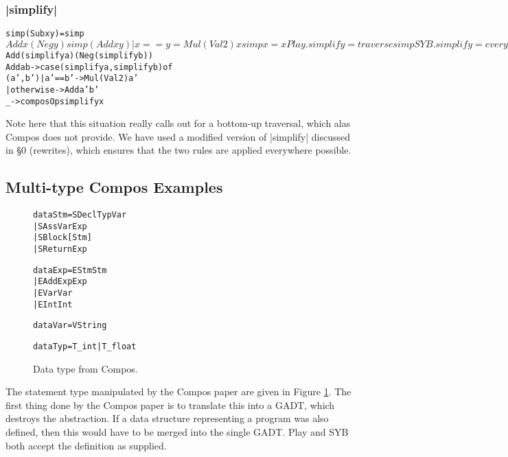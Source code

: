 \documentclass[preprint]{sigplanconf}
\newenvironment{code}{\begin{alltt}\small}{\end{alltt}}
\begin{document}
\subsubsection{|simplify|}

\begin{code}
simp (Sub x y)           = simp $ Add x (Neg y)
simp (Add x y) | x == y  = Mul (Val 2) x
simp x                   = x

Play.simplify = traverse simp

SYB.simplify = everywhere (mkT simp)

Comp.simplify :: Expr a -> Expr a
Comp.simplify x = case x of
    Sub  a b -> simplify $ Add (simplify a) (Neg (simplify b))
    Add  a b -> case  (simplify a, simplify b) of
                      (a',b')  | a' == b'   -> Mul (Val 2) a'
                               | otherwise  -> Add a' b'
    _ -> composOp simplify x
\end{code}

Note here that this situation really calls out for a bottom-up traversal, which alas Compos does not provide. We have used a modified version of |simplify| discussed in \S0 (rewrites), which ensures that the two rules are applied everywhere possible.


\subsection{Multi-type Compos Examples}

\begin{figure}
\begin{code}
data Stm  =  SDecl    Typ Var
          |  SAss     Var Exp
          |  SBlock   [Stm]
          |  SReturn  Exp

data Exp  =  EStm  Stm
          |  EAdd  Exp Exp
          |  EVar  Var
          |  EInt  Int

data Var  =  V String

data Typ  =  T_int | T_float
\end{code}
\caption{Data type from Compos.}
\label{fig:compos}
\end{figure}

The statement type manipulated by the Compos paper are given in Figure \ref{fig:compos}. The first thing done by the Compos paper is to translate this into a GADT, which destroys the abstraction. If a data structure representing a program was also defined, then this would have to be merged into the single GADT. Play and SYB both accept the definition as supplied.
\end{document}
